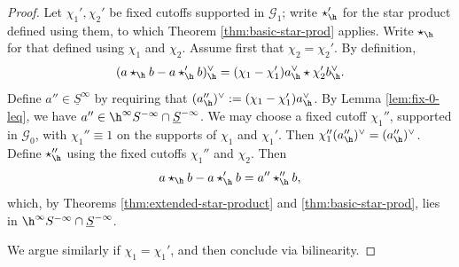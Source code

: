\begin{proof}
  Let $\chi_1', \chi_2'$ be fixed cutoffs supported in $\mathcal{G}_1$; write $\star_{\h}'$ for the star product defined using them, to which Theorem \ref{thm:basic-star-prod} applies.  Write $\star_{\h}$ for that defined using $\chi_1$ and $\chi_2$.  Assume first that $\chi_2 = \chi_2'$.
  By definition,
  \begin{equation*}
    (a \star_{\h} b - a \star_{\h} ' b)_{\h}^\vee
    = (\chi_1 - \chi_1 ') a_{\h}^\vee \star \chi_2 ' b_{\h}^\vee.
  \end{equation*}
  Define $a'' \in \underline{S}^\infty$ by requiring that $(a_{\h}'')^\vee  := (\chi_1 - \chi_1 ') a_{\h}^\vee$.  By Lemma \ref{lem:fix-0-leq}, we have $a'' \in \h^\infty S^{-\infty} \cap \underline{S}^{-\infty}$.  We may choose a fixed cutoff $\chi_1 ''$, supported in $\mathcal{G}_0$, with $\chi_1'' \equiv 1$ on the supports of $\chi_1$ and $\chi_1 '$.  Then $\chi_1 '' (a_{\h}'')^\vee  = (a_{\h}'')^\vee$.  Define $\star_{\h}''$ using the fixed cutoffs $\chi_1''$ and $\chi_2$.  Then
  \begin{equation*}
    a \star_{\h} b - a \star_{\h}' b = a'' \star_{\h}'' b,
  \end{equation*}
  which, by Theorems \ref{thm:extended-star-product} and \ref{thm:basic-star-prod}, lies in $\h^\infty S^{-\infty} \cap \underline{S}^{-\infty}$.

  We argue similarly if $\chi_1 = \chi_1'$, and then conclude via bilinearity.
\end{proof}


